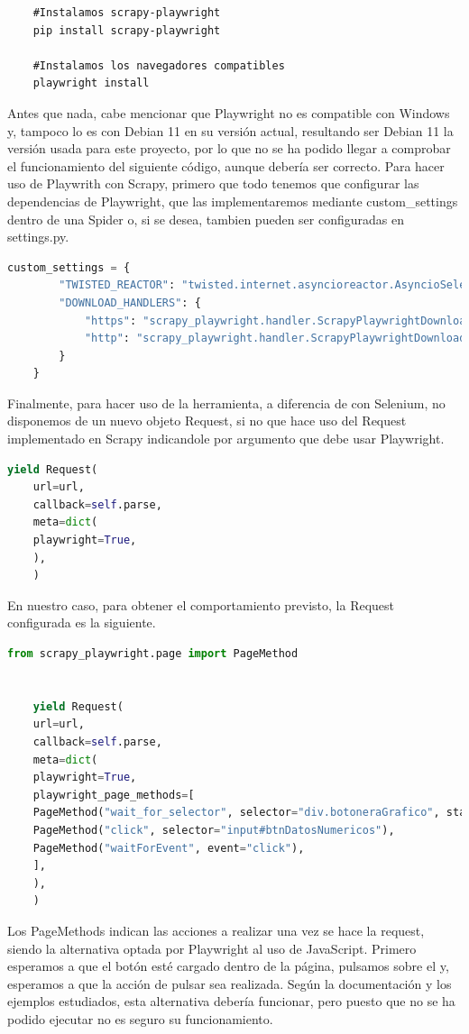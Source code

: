 \begin{verbatim}
	#Instalamos scrapy-playwright
	pip install scrapy-playwright
	
	#Instalamos los navegadores compatibles
	playwright install
\end{verbatim}

Antes que nada, cabe mencionar que Playwright no es compatible con Windows y, tampoco lo es con Debian 11 en su versión actual, resultando ser Debian 11 la versión usada para este proyecto, por lo que no se ha podido llegar a comprobar el funcionamiento del siguiente código, aunque debería ser correcto.\newline
\newline
Para hacer uso de Playwrith con Scrapy, primero que todo tenemos que configurar las dependencias de Playwright, que las implementaremos mediante custom\_settings dentro de una Spider o, si se desea, tambien pueden ser configuradas en settings.py.

\begin{lstlisting}[language=Python, caption={Configuración Playwright}]
	custom_settings = {
		"TWISTED_REACTOR": "twisted.internet.asyncioreactor.AsyncioSelectorReactor",
		"DOWNLOAD_HANDLERS": {
			"https": "scrapy_playwright.handler.ScrapyPlaywrightDownloadHandler",
			"http": "scrapy_playwright.handler.ScrapyPlaywrightDownloadHandler",
		}
	}
\end{lstlisting}

Finalmente, para hacer uso de la herramienta, a diferencia de con Selenium, no disponemos de un nuevo objeto Request, si no que hace uso del Request implementado en Scrapy indicandole por argumento que debe usar Playwright.

\begin{lstlisting}[language=Python, caption={Playwright basic Request}]
	yield Request(
	url=url,
	callback=self.parse,
	meta=dict(
	playwright=True,
	),
	)
\end{lstlisting}

En nuestro caso, para obtener el comportamiento previsto, la Request configurada es la siguiente.

\begin{lstlisting}[language=Python, caption={Agua en Navarra Playwright Request}]
	from scrapy_playwright.page import PageMethod
	
	
	yield Request(
	url=url,
	callback=self.parse,
	meta=dict(
	playwright=True,
	playwright_page_methods=[
	PageMethod("wait_for_selector", selector="div.botoneraGrafico", state="visible"),
	PageMethod("click", selector="input#btnDatosNumericos"),
	PageMethod("waitForEvent", event="click"),
	],
	),
	)
\end{lstlisting}

Los PageMethods indican las acciones a realizar una vez se hace la request, siendo la alternativa optada por Playwright al uso de JavaScript. Primero esperamos a que el botón esté cargado dentro de la página, pulsamos sobre el y, esperamos a que la acción de pulsar sea realizada.\newline
\newline
Según la documentación y los ejemplos estudiados, esta alternativa debería funcionar, pero puesto que no se ha podido ejecutar no es seguro su funcionamiento.